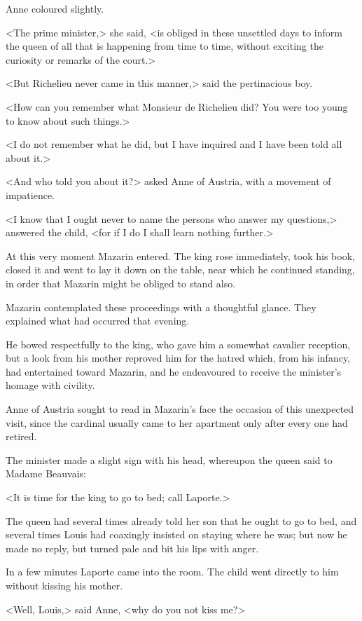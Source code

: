 Anne coloured slightly.

<The prime minister,> she said, <is obliged in these unsettled days to inform the queen of all that is happening from time to time, without exciting the curiosity or remarks of the court.>

<But Richelieu never came in this manner,> said the pertinacious boy.

<How can you remember what Monsieur de Richelieu did? You were too young to know about such things.>

<I do not remember what he did, but I have inquired and I have been told all about it.>

<And who told you about it?> asked Anne of Austria, with a movement of impatience.

<I know that I ought never to name the persons who answer my questions,> answered the child, <for if I do I shall learn nothing further.>

At this very moment Mazarin entered. The king rose immediately, took his book, closed it and went to lay it down on the table, near which he continued standing, in order that Mazarin might be obliged to stand also.

Mazarin contemplated these proceedings with a thoughtful glance. They explained what had occurred that evening.

He bowed respectfully to the king, who gave him a somewhat cavalier reception, but a look from his mother reproved him for the hatred which, from his infancy,  had entertained toward Mazarin, and he endeavoured to receive the minister's homage with civility.

Anne of Austria sought to read in Mazarin's face the occasion of this unexpected visit, since the cardinal usually came to her apartment only after every one had retired.

The minister made a slight sign with his head, whereupon the queen said to Madame Beauvais:

<It is time for the king to go to bed; call Laporte.>

The queen had several times already told her son that he ought to go to bed, and several times Louis had coaxingly insisted on staying where he was; but now he made no reply, but turned pale and bit his lips with anger.

In a few minutes Laporte came into the room. The child went directly to him without kissing his mother.

<Well, Louis,> said Anne, <why do you not kiss me?>

